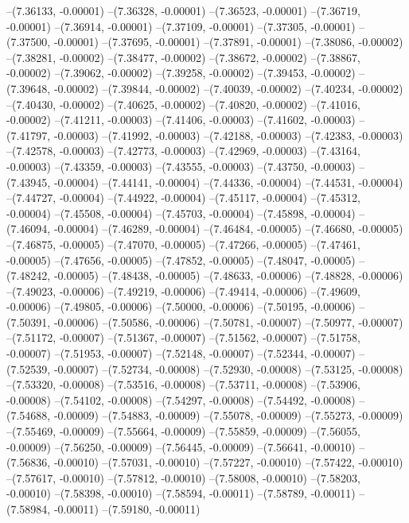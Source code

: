 --(7.36133, -0.00001)
--(7.36328, -0.00001)
--(7.36523, -0.00001)
--(7.36719, -0.00001)
--(7.36914, -0.00001)
--(7.37109, -0.00001)
--(7.37305, -0.00001)
--(7.37500, -0.00001)
--(7.37695, -0.00001)
--(7.37891, -0.00001)
--(7.38086, -0.00002)
--(7.38281, -0.00002)
--(7.38477, -0.00002)
--(7.38672, -0.00002)
--(7.38867, -0.00002)
--(7.39062, -0.00002)
--(7.39258, -0.00002)
--(7.39453, -0.00002)
--(7.39648, -0.00002)
--(7.39844, -0.00002)
--(7.40039, -0.00002)
--(7.40234, -0.00002)
--(7.40430, -0.00002)
--(7.40625, -0.00002)
--(7.40820, -0.00002)
--(7.41016, -0.00002)
--(7.41211, -0.00003)
--(7.41406, -0.00003)
--(7.41602, -0.00003)
--(7.41797, -0.00003)
--(7.41992, -0.00003)
--(7.42188, -0.00003)
--(7.42383, -0.00003)
--(7.42578, -0.00003)
--(7.42773, -0.00003)
--(7.42969, -0.00003)
--(7.43164, -0.00003)
--(7.43359, -0.00003)
--(7.43555, -0.00003)
--(7.43750, -0.00003)
--(7.43945, -0.00004)
--(7.44141, -0.00004)
--(7.44336, -0.00004)
--(7.44531, -0.00004)
--(7.44727, -0.00004)
--(7.44922, -0.00004)
--(7.45117, -0.00004)
--(7.45312, -0.00004)
--(7.45508, -0.00004)
--(7.45703, -0.00004)
--(7.45898, -0.00004)
--(7.46094, -0.00004)
--(7.46289, -0.00004)
--(7.46484, -0.00005)
--(7.46680, -0.00005)
--(7.46875, -0.00005)
--(7.47070, -0.00005)
--(7.47266, -0.00005)
--(7.47461, -0.00005)
--(7.47656, -0.00005)
--(7.47852, -0.00005)
--(7.48047, -0.00005)
--(7.48242, -0.00005)
--(7.48438, -0.00005)
--(7.48633, -0.00006)
--(7.48828, -0.00006)
--(7.49023, -0.00006)
--(7.49219, -0.00006)
--(7.49414, -0.00006)
--(7.49609, -0.00006)
--(7.49805, -0.00006)
--(7.50000, -0.00006)
--(7.50195, -0.00006)
--(7.50391, -0.00006)
--(7.50586, -0.00006)
--(7.50781, -0.00007)
--(7.50977, -0.00007)
--(7.51172, -0.00007)
--(7.51367, -0.00007)
--(7.51562, -0.00007)
--(7.51758, -0.00007)
--(7.51953, -0.00007)
--(7.52148, -0.00007)
--(7.52344, -0.00007)
--(7.52539, -0.00007)
--(7.52734, -0.00008)
--(7.52930, -0.00008)
--(7.53125, -0.00008)
--(7.53320, -0.00008)
--(7.53516, -0.00008)
--(7.53711, -0.00008)
--(7.53906, -0.00008)
--(7.54102, -0.00008)
--(7.54297, -0.00008)
--(7.54492, -0.00008)
--(7.54688, -0.00009)
--(7.54883, -0.00009)
--(7.55078, -0.00009)
--(7.55273, -0.00009)
--(7.55469, -0.00009)
--(7.55664, -0.00009)
--(7.55859, -0.00009)
--(7.56055, -0.00009)
--(7.56250, -0.00009)
--(7.56445, -0.00009)
--(7.56641, -0.00010)
--(7.56836, -0.00010)
--(7.57031, -0.00010)
--(7.57227, -0.00010)
--(7.57422, -0.00010)
--(7.57617, -0.00010)
--(7.57812, -0.00010)
--(7.58008, -0.00010)
--(7.58203, -0.00010)
--(7.58398, -0.00010)
--(7.58594, -0.00011)
--(7.58789, -0.00011)
--(7.58984, -0.00011)
--(7.59180, -0.00011)
